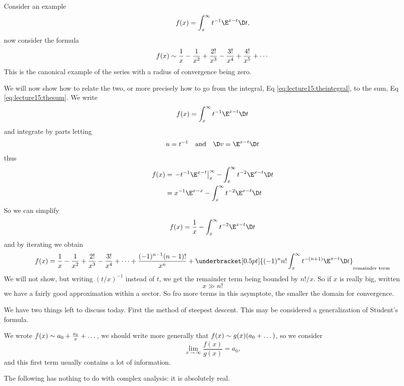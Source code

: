 Consider an example
\begin{equation}\label{eq:lecture15:theintegral}
f(x)=\int^{\infty}_{x}t^{-1}\E^{x-t}\D t,
\end{equation}
now consider the formula
\begin{equation}\label{eq:lecture15:thesum}
f(x)\sim\frac{1}{x}-\frac{1}{x^{2}}+\frac{2!}{x^{3}}
-\frac{3!}{x^{4}}+\frac{4!}{x^{5}}+\cdots
\end{equation}
This is the canonical example of the series with a radius of
convergence being zero.

We will now show how to relate the two, or more precisely how to
go from the integral, Eq \eqref{eq:lecture15:theintegral}, to the
sum, Eq \eqref{eq:lecture15:thesum}. We write
\begin{equation}
f(x) = \int^{\infty}_{x}t^{-1}\E^{x-t}\D t
\end{equation}
and integrate by parts letting
\begin{equation}
u=t^{-1}\quad\mbox{and}\quad \D v=\E^{x-t}\D t
\end{equation}
thus
\begin{equation}
\begin{split}
f(x)&=\left.-t^{-1}\E^{x-t}\right|^{\infty}_{x}-\int^{\infty}_{x}t^{-2}\E^{x-t}\D t\\
&=x^{-1}\E^{x-x}-\int^{\infty}_{x}t^{-2}\E^{x-t}\D t
\end{split}
\end{equation}
So we can simplify
\begin{equation}
f(x)=\frac{1}{x}-\int^{\infty}_{x} t^{-2}\E^{x-t}\D t
\end{equation}
and by iterating we obtain
\begin{equation}
f(x)=\frac{1}{x}-\frac{1}{x^{2}}+\frac{2!}{x^{3}}-\frac{3!}{x^{4}}+\dots+\frac{(-1)^{n-1}(n-1)!}{x^{n}}+\underbracket[0.5pt]{(-1)^{n}n!\int^{\infty}_{x} t^{-(n+1)}\E^{x-t}\D t}_{\text{remainder term}}
\end{equation}
We will not show, but writing $(t/x)^{-1}$ instead of $t$, we get
the remainder term being bounded by $n!/x$. So if $x$ is really
big, written
\begin{equation}
x\gg n!
\end{equation}
we have a fairly good approximation within a sector. So fro more
terms in this asymptote, the smaller the domain for convergence.

We have two things left to discuss today. First the method of
steepest descent. This may be considered a generalization of
Student's formula.
\begin{rmk}
We wrote $f(x)\sim a_{0}+\frac{a_{1}}{x}+\dots$, we should
write more generally that $f(x)\sim g(x)(a_{0}+\dots)$, so
we consider
\begin{equation}
\lim_{x\to\infty}\frac{f(x)}{g(x)}=a_{0},
\end{equation}
and this first term usually contains a lot of information.
\end{rmk}
The following has nothing to do with complex analysis: it is
absolutely real.

